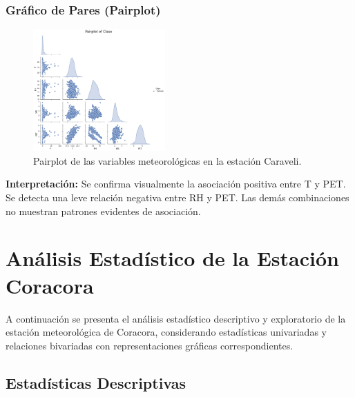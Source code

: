\subsubsection*{Gráfico de Pares (Pairplot)}
\begin{figure}[H]
\centering
\includegraphics[width=0.45\textwidth]{resultados/por_estacion_meteorologica/Caraveli/pairplot.png}
\caption{Pairplot de las variables meteorológicas en la estación Caraveli.}
\label{fig:caraveli_pairplot}
\end{figure}
\textbf{Interpretación:} Se confirma visualmente la asociación positiva entre T y PET. Se detecta una leve relación negativa entre RH y PET. Las demás combinaciones no muestran patrones evidentes de asociación.




\section{Análisis Estadístico de la Estación Coracora}

A continuación se presenta el análisis estadístico descriptivo y exploratorio de la estación meteorológica de Coracora, considerando estadísticas univariadas y relaciones bivariadas con representaciones gráficas correspondientes.

\subsection{Estadísticas Descriptivas}

